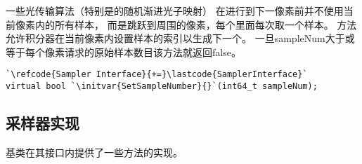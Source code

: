一些光传输算法（特别是的随机渐进光子映射）
在进行到下一像素前并不使用当前像素内的所有样本，
而是跳跃到周围的像素，每个里面每次取一个样本。
方法允许积分器在当前像素内设置样本的索引以生成下一个。
一旦{\ttfamily sampleNum}大于或等于每个像素请求的原始样本数目该方法就返回{\ttfamily false}。
\begin{lstlisting}
`\refcode{Sampler Interface}{+=}\lastcode{SamplerInterface}`
virtual bool `\initvar{SetSampleNumber}{}`(int64_t sampleNum);
\end{lstlisting}

\subsection{采样器实现}\label{sub:采样器实现}
基类在其接口内提供了一些方法的实现。